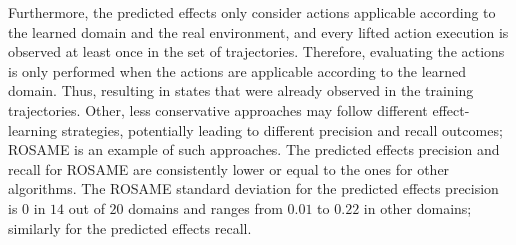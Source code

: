 \documentclass[letterpaper]{article} %
\newcommand{\rosame}{ROSAME\xspace}
\begin{document}
Furthermore, the predicted effects only consider actions applicable according to the learned domain and the real environment, and every lifted action execution is observed at least once in the set of trajectories. 
Therefore, evaluating the actions is only performed when the actions are applicable according to the learned domain. Thus, resulting in states that were already observed in the training trajectories.
Other, less conservative approaches may follow different effect-learning strategies, potentially leading to different precision and recall outcomes; \rosame is an example of such approaches.
The predicted effects precision and recall for \rosame are consistently lower or equal to the ones for other algorithms. The \rosame standard deviation for the predicted effects precision is $0$ in $14$ out of $20$ domains and ranges from $0.01$ to $0.22$ in other domains; similarly for the predicted effects recall.
%
%
\end{document}
